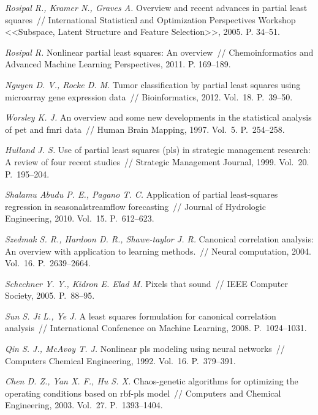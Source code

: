\documentclass[12pt]{article}
\begin{document}
	
	\begin{thebibliography}{99}
		
		\textit{Rosipal R., Kramer N., Graves A.} Overview and recent advances in partial least squares~// International Statistical and Optimization Perspectives Workshop <<Subspace, Latent Structure and Feature Selection>>, 2005. P. 34--51.
		
		\textit{Rosipal R.} Nonlinear partial least squares: An overview~// Chemoinformatics and Advanced Machine Learning Perspectives, 2011. P. 169--189.
		
		\textit{Nguyen D. V., Rocke D. M.} Tumor classification by partial least squares using microarray gene expression data~// Bioinformatics, 2012.  Vol.~18. P.~39--50. 
		
		\textit{Worsley K. J.} An overview and some new developments in the statistical analysis of pet and fmri data~// Human Brain Mapping, 1997. Vol.~5. P.~254--258.
		
		\textit{Hulland J. S.} Use of partial least squares (pls) in strategic management research: A review of four recent studies~// Strategic Management Journal, 1999. Vol.~20. P.~195--204.
		
		\textit{Shalamu Abudu P. E., Pagano T. C.} Application of partial least-squares regression in seasonalstreamflow forecasting~// Journal of Hydrologic Engineering, 2010. Vol.~15. P.~612--623.
		
		\textit{Szedmak S. R., Hardoon D. R., Shawe-taylor J. R.} Canonical correlation analysis: An overview with application to learning methods.~// Neural computation, 2004. Vol.~16. P.~2639--2664.
		
		\textit{Schechner Y. Y., Kidron E. Elad M.} Pixels that sound~// IEEE Computer Society, 2005. P.~88--95.
		
		\textit{Sun S. Ji L., Ye J.} A least squares formulation for canonical correlation analysis~// International Confenence on Machine Learning, 2008. P.~1024--1031.
		
		\textit{Qin S. J., McAvoy T. J.} Nonlinear pls modeling using neural networks~// Computers Chemical Engineering, 1992. Vol.~16. P.~379--391.
		
		\textit{Chen D. Z., Yan X. F., Hu S. X.} Chaos-genetic algorithms for optimizing the operating conditions based on rbf-pls model~// Computers and Chemical Engineering, 2003. Vol.~27. P.~1393--1404.
		

\end{thebibliography}
\end{document}
